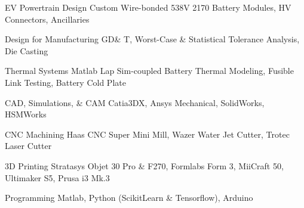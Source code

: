 


\begin{cvskills}





\cvskill
{EV Powertrain Design}
{Custom Wire-bonded 538V 2170 Battery Modules, HV Connectors, Ancillaries}

\cvskill
{Design for Manufacturing}
{GD\& T, Worst-Case \& Statistical Tolerance Analysis, Die Casting}

\cvskill
{Thermal Systems}
{Matlab Lap Sim-coupled Battery Thermal Modeling, Fusible Link Testing, Battery Cold Plate}

\cvskill
{CAD, Simulations, \& CAM} %
{Catia3DX, Ansys Mechanical, SolidWorks, HSMWorks} %

\cvskill
{CNC Machining}
{Haas CNC Super Mini Mill, Wazer Water Jet Cutter, Trotec Laser Cutter}

\cvskill
{3D Printing} %
{Stratasys Objet 30 Pro \& F270, Formlabs Form 3, MiiCraft 50, Ultimaker S5, Prusa i3 Mk.3} %

\cvskill
{Programming} %
{Matlab, Python (ScikitLearn \& Tensorflow), Arduino} %



\end{cvskills}
